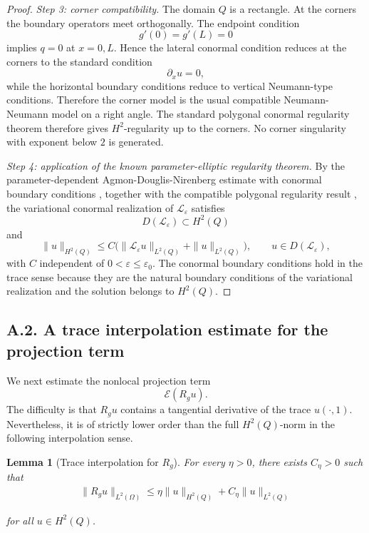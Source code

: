 \documentclass[11pt]{article}
\newtheorem{lemma}[theorem]{Lemma}
\theoremstyle{definition}
\theoremstyle{remark}
\numberwithin{equation}{section}
\begin{document}
\begin{proof}
\emph{Step 3: corner compatibility.}
The domain \(Q\) is a rectangle. At the corners the boundary operators meet
orthogonally. The endpoint condition
\[
g'(0)=g'(L)=0
\]
implies \(q=0\) at \(x=0,L\). Hence the lateral conormal condition reduces at
the corners to the standard condition
\[
\partial_xu=0,
\]
while the horizontal boundary conditions reduce to vertical Neumann-type
conditions. Therefore the corner model is the usual compatible Neumann-Neumann
model on a right angle. The standard polygonal conormal regularity theorem
therefore gives \(H^2\)-regularity up to the corners. No corner singularity
with exponent below \(2\) is generated.

\emph{Step 4: application of the known parameter-elliptic regularity theorem.}
By the parameter-dependent Agmon-Douglis-Nirenberg estimate with conormal
boundary conditions \cite{AgmonDouglisNirenberg1959,AgmonDouglisNirenberg1964}, together with the compatible polygonal regularity result \cite{Grisvard1985},
the variational conormal realization of \(\mathscr L_\varepsilon\) satisfies
\[
D(\mathscr L_\varepsilon)\subset H^2(Q)
\]
and
\[
\|u\|_{H^2(Q)}
\le
C\bigl(
\|\mathscr L_\varepsilon u\|_{L^2(Q)}
+
\|u\|_{L^2(Q)}
\bigr),
\qquad
u\in D(\mathscr L_\varepsilon),
\]
with \(C\) independent of \(0<\varepsilon\le\varepsilon_0\). The conormal
boundary conditions hold in the trace sense because they are the natural
boundary conditions of the variational realization and the solution belongs to
\(H^2(Q)\).
\end{proof}

\subsection*{A.2. A trace interpolation estimate for the projection term}

We next estimate the nonlocal projection term
\[
\mathcal E(R_gu).
\]
The difficulty is that \(R_gu\) contains a tangential derivative of the trace
\(u(\cdot,1)\). Nevertheless, it is of strictly lower order than the full
\(H^2(Q)\)-norm in the following interpolation sense.

\begin{lemma}[Trace interpolation for \(R_g\)]
\label{lem:trace-interpolation-Rg}
For every \(\eta>0\), there exists \(C_\eta>0\) such that
\begin{align}
  \|R_gu\|_{L^2(\Omega)}
\le
\eta\|u\|_{H^2(Q)}
+
C_\eta\|u\|_{L^2(Q)}
\label{eq:Rg-trace-interpolation}  
\end{align}

for all \(u\in H^2(Q)\).
\end{lemma}
\end{document}
